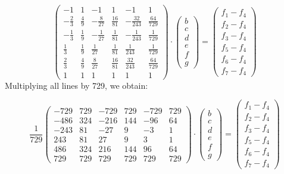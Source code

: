 \[
\left(
\begin{array}{cccccc}
 -1       & 1       & -1           & 1 & -1 & 1  \\
 -\frac23 & \frac49 & -\frac{8}{27}& \frac{16}{81} & -\frac{32}{243} & \frac{64}{729}  \\
 -\frac13 & \frac19 & -\frac{1}{27}& \frac{1}{81}  & -\frac{1}{243}  & \frac{1}{729}  \\
 \frac13  & \frac19 & \frac{1}{27} & \frac{1}{81}  & \frac{1}{243}  & \frac{1}{729}  \\
 \frac23  & \frac49 & \frac{8}{27} & \frac{16}{81} & \frac{32}{243} & \frac{64}{729}  \\
 1        & 1       & 1            & 1 & 1 & 1  
\end{array}
\right)
\cdot
\left(
\begin{array}{c}
b \\ c \\ d \\ e \\ f \\ g
\end{array}
\right)
=
\left(
\begin{array}{c}
f_1 -f_4 \\ f_2 -f_4\\ f_3 -f_4 \\ f_5 -f_4\\ f_6 -f_4\\ f_7-f_4
\end{array}
\right)
\]
Multiplying all lines by 729, we obtain:

\[
\frac{1}{729}
\left(
\begin{array}{cccccc}
 -729 & 729 & -729 & 729 & -729 & 729  \\
 -486 & 324 & -216 & 144 & -96  & 64  \\
 -243 & 81  & -27  & 9   & -3   & 1  \\
 243  & 81  & 27   & 9   & 3    & 1  \\
 486  & 324 & 216  & 144 & 96   & 64  \\
729   & 729 & 729  & 729 & 729  & 729  
\end{array}
\right)
\cdot
\left(
\begin{array}{c}
b \\ c \\ d \\ e \\ f \\ g
\end{array}
\right)
=
\left(
\begin{array}{c}
f_1 -f_4 \\ f_2 -f_4\\ f_3 -f_4 \\ f_5 -f_4\\ f_6 -f_4\\ f_7-f_4
\end{array}
\right)
\]

